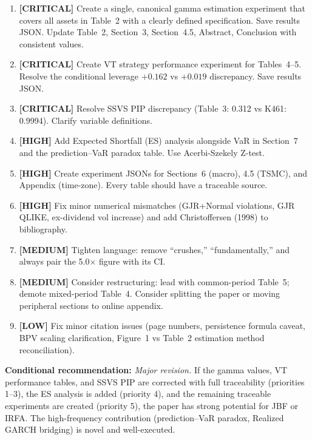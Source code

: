 \documentclass[12pt,a4paper]{article}
\begin{document}
\begin{enumerate}
\item \textbf{[CRITICAL]} Create a single, canonical gamma estimation experiment that covers all assets in Table~2 with a clearly defined specification. Save results JSON. Update Table~2, Section~3, Section~4.5, Abstract, Conclusion with consistent values.

\item \textbf{[CRITICAL]} Create VT strategy performance experiment for Tables~4--5. Resolve the conditional leverage $+0.162$ vs $+0.019$ discrepancy. Save results JSON.

\item \textbf{[CRITICAL]} Resolve SSVS PIP discrepancy (Table~3: 0.312 vs K461: 0.9994). Clarify variable definitions.

\item \textbf{[HIGH]} Add Expected Shortfall (ES) analysis alongside VaR in Section~7 and the prediction--VaR paradox table. Use Acerbi-Szekely Z-test.

\item \textbf{[HIGH]} Create experiment JSONs for Sections~6 (macro), 4.5 (TSMC), and Appendix (time-zone). Every table should have a traceable source.

\item \textbf{[HIGH]} Fix minor numerical mismatches (GJR+Normal violations, GJR QLIKE, ex-dividend vol increase) and add Christoffersen (1998) to bibliography.

\item \textbf{[MEDIUM]} Tighten language: remove ``crushes,'' ``fundamentally,'' and always pair the 5.0$\times$ figure with its CI.

\item \textbf{[MEDIUM]} Consider restructuring: lead with common-period Table~5; demote mixed-period Table~4. Consider splitting the paper or moving peripheral sections to online appendix.

\item \textbf{[LOW]} Fix minor citation issues (page numbers, persistence formula caveat, BPV scaling clarification, Figure~1 vs Table~2 estimation method reconciliation).
\end{enumerate}

\bigskip
\noindent\textbf{Conditional recommendation:} \textit{Major revision.} If the gamma values, VT performance tables, and SSVS PIP are corrected with full traceability (priorities 1--3), the ES analysis is added (priority 4), and the remaining traceable experiments are created (priority 5), the paper has strong potential for JBF or IRFA. The high-frequency contribution (prediction--VaR paradox, Realized GARCH bridging) is novel and well-executed.
\end{document}
